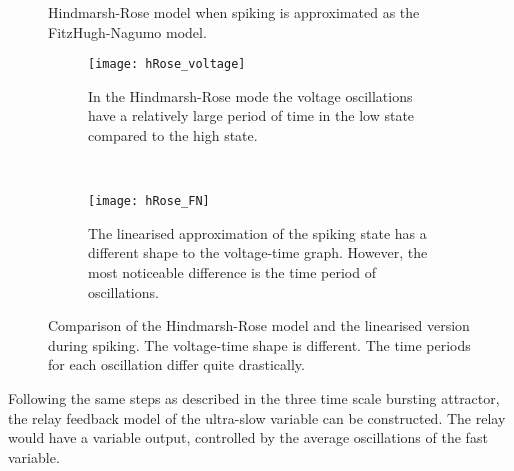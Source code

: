 \documentclass[a4paper, 12pt]{article}
\begin{document}
\begin{figure}[h!]
\caption{Hindmarsh-Rose model when spiking is approximated as the FitzHugh-Nagumo model.}
\label{fig:hRose_FN_bloc}
\end{figure}

\begin{figure}[h!]
    \centering
    \begin{subfigure}[t]{0.48\textwidth}
        \texttt{[image: hRose\_voltage]}
        \caption{In the Hindmarsh-Rose mode the voltage oscillations have a relatively large period of time in the low state compared to the high state. }
        \label{fig:hRose_voltage}
    \end{subfigure}
    ~ %
    \begin{subfigure}[t]{0.48\textwidth}
        \texttt{[image: hRose\_FN]}
        \caption{The linearised approximation of the spiking state has a different shape to the voltage-time graph. However, the most noticeable difference is the time period of oscillations. }
        \label{fig:hRose_FN}
    \end{subfigure}
\caption{Comparison of the Hindmarsh-Rose model and the linearised version during spiking. The voltage-time shape is different. The time periods for each oscillation differ quite drastically.}
\label{fig:hRose_linearisation_poor}
\end{figure}

Following the same steps as described in the three time scale bursting attractor, the relay feedback model of the ultra-slow variable can be constructed. The relay would have a variable output, controlled by the average oscillations of the fast variable. 


\FloatBarrier
\end{document}
